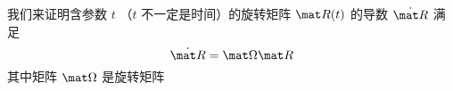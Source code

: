 

我们来证明含参数 $t$ （$t$ 不一定是时间）的旋转矩阵 $\mat R(t)$ 的导数 $\dot{\mat R}$ 满足
\begin{equation}
\dot{\mat R} = \mat \Omega \mat R
\end{equation}
其中矩阵 $\mat \Omega$ 是旋转矩阵